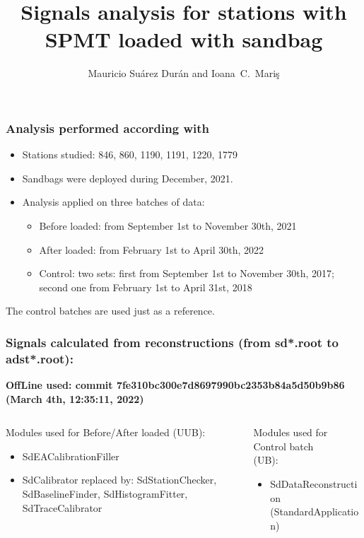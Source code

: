 \documentclass[aspectratio=169]{beamer}
\title{Signals analysis for stations with SPMT loaded with sandbag}
\author{
  Mauricio Su\'arez Dur\'an and Ioana~C.~Mari\c{s}
}
\institute{IIHE-ULB}
\begin{document}
\begin{frame}
  \titlepage
\end{frame}


\begin{frame}
  \frametitle{Analysis performed according with}
  \begin{itemize}
    \item Stations studied: 846, 860, 1190, 1191, 1220, 1779
      \vspace{0.2cm}
    \item Sandbags were deployed during December, 2021.
      \vspace{0.2cm}
    \item Analysis applied on three batches of data:
      \vspace{0.1cm}
      \begin{itemize}
        \item Before loaded: from September 1st to November 30th,
          2021
          \vspace{0.1cm}
        \item After loaded: from February 1st to April 30th, 2022
          \vspace{0.1cm}
        \item Control: two sets: first from September 1st to
          November 30th, 2017; second one from February 1st to
          April 31st, 2018
      \end{itemize}
  \end{itemize}
  \vspace{.5cm}

  The control batches are used just as a reference.
\end{frame}

\begin{frame}
  \frametitle{Signals calculated from reconstructions (from
  sd*.root to adst*.root):}
  {\bf OffLine used: commit
  7fe310bc300e7d8697990bc2353b84a5d50b9b86\\
  (March 4th, 12:35:11, 2022)}
  \vspace{.5cm}

  \begin{columns}[T]
    \begin{column}{.5\textwidth}
      Modules used for Before/After loaded (UUB):
      \begin{itemize}
        \item SdEACalibrationFiller
        \item SdCalibrator replaced by: SdStationChecker,
          SdBaselineFinder, SdHistogramFitter, SdTraceCalibrator
      \end{itemize}
    \end{column}
    \begin{column}{.5\textwidth}
      Modules used for Control batch\\
      (UB):
      \begin{itemize}
        \item SdDataReconstruction (StandardApplication)
      \end{itemize}
    \end{column}
  \end{columns}
\end{frame}
\end{document}
